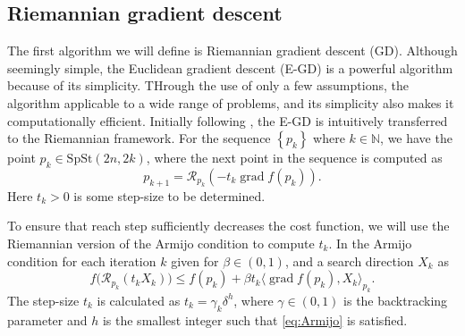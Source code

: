 \subsection{Riemannian gradient descent}
The first algorithm we will define is Riemannian gradient descent (GD). Although seemingly simple, the Euclidean gradient descent (E-GD) is a powerful algorithm because of its simplicity. THrough the use of only a few assumptions, the algorithm applicable to a wide range of problems, and its simplicity also makes it computationally efficient. Initially following \cite[p.~56]{Boumal2023}, the E-GD is intuitively transferred to the Riemannian framework. For the sequence $\left\{ p_{k} \right\}$ where $k\in \mathbb{N}$, we have the point $p_{k}\in \mathrm{SpSt}(2n, 2k)$, where the next point in the sequence is computed as 
%
\begin{equation*}
p_{k+1}=\mathcal{R}_{p_{k}}(-t_{k}\operatorname{grad}f(p_{k})).
\end{equation*}
%
Here $t_{k}>0$ is some step-size to be determined. 

To ensure that reach step sufficiently decreases the cost function, we will use the Riemannian version of the Armijo condition to compute $t_{k}$. In \cite[p.~17]{GaoSonAbsilStykel2021} the Armijo condition for each iteration $k$ given for $\beta \in(0,1)$, and a search direction $X_{k}$ as
%
\begin{equation}\label{eq:Armijo}
f\big(\mathcal{R}_{p_{k}}(t_{k}X_{k})\big)\leq f(p_{k})+\beta t_{k}\langle \operatorname{grad}f(p_{k}),X_{k} \rangle _{p_{k}}.
\end{equation}
%
The step-size $t_{k}$ is calculated as $t_{k}=\gamma_{k}\delta^{h}$, where $\gamma\in(0,1)$ is the backtracking parameter and $h$ is the smallest integer such that \eqref{eq:Armijo} is satisfied. 


